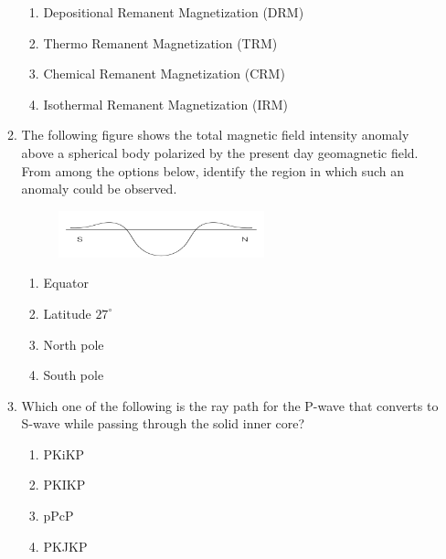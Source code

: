 \documentclass[journal,12pt,onecolumn]{IEEEtran}
\begin{document}
\begin{enumerate}
\begin{enumerate}
\hfill{}


\begin{enumerate}[label=(\Alph*)]
\item Depositional Remanent Magnetization (DRM)
\item Thermo Remanent Magnetization (TRM)
\item Chemical Remanent Magnetization (CRM)
\item Isothermal Remanent Magnetization (IRM)
\end{enumerate}


\item The following figure shows the total magnetic field intensity anomaly above a spherical body polarized by the present day geomagnetic field. From among the options below, identify the region in which such an anomaly could be observed.

\begin{figure}[h]
\centering
\includegraphics[width=0.6\textwidth]{figs/fig13.png}
\caption{}
\label{fig:q36}
\end{figure}

\hfill{}

\begin{multicols}{4}
\begin{enumerate}[label=(\Alph*)]
\item Equator
\item Latitude $27^\circ$
\item North pole
\item South pole
\end{enumerate}
\end{multicols}

\item Which one of the following is the ray path for the P-wave that converts to S-wave while passing through the solid inner core?

\hfill{}

\begin{multicols}{4}
\begin{enumerate}[label=(\Alph*)]
\item PKiKP
\item PKIKP
\item pPcP
\item PKJKP
\end{enumerate}
\end{multicols}


\end{enumerate}
\end{enumerate}
\end{document}
